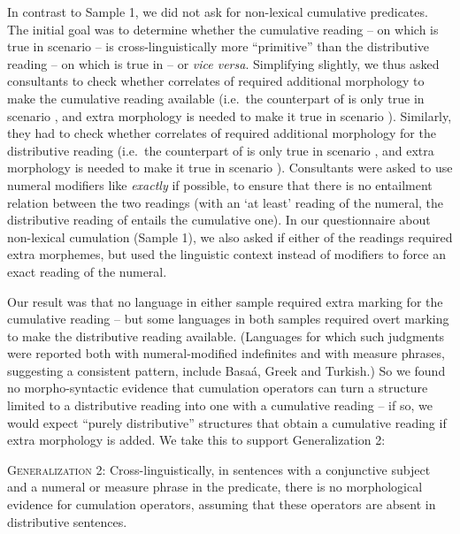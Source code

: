 \documentclass[output=paper]{langscibook}
\begin{document}
In contrast to Sample 1, we did not ask for non-lexical cumulative predicates. The initial goal was to determine whether the cumulative reading -- on which  is true in scenario  -- is cross-linguistically more ``primitive'' than the distributive reading -- on which  is true in  -- or \textit{vice versa}. Simplifying slightly, we thus asked consultants to check whether correlates of  required additional morphology to make the cumulative reading available (i.e.~the counterpart of  is only true in scenario  , and extra morphology is needed to make it true in scenario  ). Similarly, they had to check whether correlates of  required additional morphology for the distributive reading (i.e.~the counterpart of  is only true in scenario , and extra morphology is needed to make it true in scenario ). Consultants were asked to use numeral modifiers like \textit{exactly} if possible, to ensure that there is no entailment relation between the two readings (with an `at least' reading of the numeral, the distributive reading of  entails the cumulative one). In our questionnaire about non-lexical cumulation (Sample 1), we also asked if either of the readings required extra morphemes, but used the linguistic context instead of modifiers to force an exact reading of the numeral.

Our result was that no language in either sample required extra marking for the cumulative reading -- but some languages in both samples required overt marking to make the distributive reading available. (Languages for which such judgments were reported both with numeral-modified indefinites and with measure phrases, suggesting a consistent pattern, include Basaá, Greek and Turkish.) So we found no morpho-syntactic evidence that cumulation operators can turn a structure limited to a distributive reading into one with a cumulative reading -- if so, we would expect ``purely distributive'' structures that obtain a cumulative reading if extra morphology is added. We take this to support Generalization 2:

\ea \textsc{Generalization 2:} Cross-linguistically, in sentences with a conjunctive subject and a numeral or measure phrase
 in the predicate, there is no morphological evidence for cumulation operators, assuming that these operators are absent in distributive sentences. \z
\end{document}
